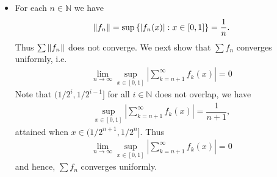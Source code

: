 \begin{problem}
\begin{solution}
\begin{itemize}
    \item[(b)] For each $n\in\mathbb{N}$ we have 
    \begin{align*}
        \left\lVert f_n\right\rVert=\sup\left\{ |f_n(x)|:x\in [0,1]\right\}=\dfrac{1}{n}.
    \end{align*}
    Thus $\sum\left\lVert f_n\right\rVert$ does not converge. We next show that $\sum f_n$ converges uniformly, i.e. 
    \begin{align*}
        \lim_{n\rightarrow\infty}\sup_{x\in [0,1]}|\sum_{k={n+1}}^\infty f_k(x)|=0
    \end{align*}
    Note that $(1/2^i,1/2^{i-1}]$ for all $i\in\mathbb{N}$ does not overlap, we have 
    \begin{align*}
        \sup_{x\in [0,1]}|\sum_{k={n+1}}^\infty f_k(x)|=\dfrac{1}{n+1},
    \end{align*}
    attained when $x\in (1/2^{n+1},1/2^n]$. Thus 
    \begin{align*}
        \lim_{n\rightarrow\infty}\sup_{x\in [0,1]}|\sum_{k={n+1}}^\infty f_k(x)|=0
    \end{align*}
    and hence, $\sum f_n$ converges uniformly. 
    
\end{itemize}
\end{solution}
\end{problem}

